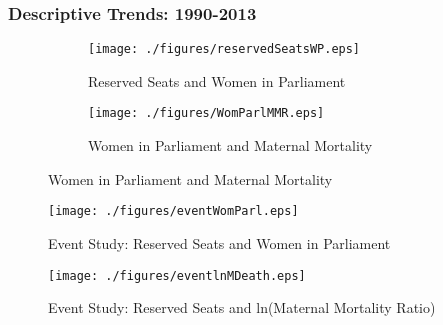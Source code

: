 \documentclass[9pt,letterpaper,subeqn]{beamer}
\begin{document}


\begin{frame}
  \frametitle{Descriptive Trends: 1990-2013}
\begin{figure}[htpb!]
  \begin{center}
    \caption{Reserved Seats, Women in Parliament and Maternal Mortality over Time}
    \label{fig:time}
    \begin{subfigure}{.5\textwidth}
      \centering
      \texttt{[image: ./figures/reservedSeatsWP.eps]}
      \caption{Reserved Seats and Women in Parliament}
      \label{fig:seatsWP}
    \end{subfigure}%
    \begin{subfigure}{.5\textwidth}
      \centering
      \texttt{[image: ./figures/WomParlMMR.eps]}
      \caption{Women in Parliament and Maternal Mortality}
      \label{fig:WPMMR}
    \end{subfigure}
  \end{center}
\end{figure}
\end{frame}


\begin{frame}[label=quotaWP]
  \begin{figure}
    \caption{Event Study: Reserved Seats and Women in Parliament}
    \texttt{[image: ./figures/eventWomParl.eps]}
  \end{figure}
\end{frame}

\begin{frame}[label=quotaMMR]
  \begin{figure}
    \caption{Event Study: Reserved Seats and ln(Maternal Mortality Ratio)}
    \texttt{[image: ./figures/eventlnMDeath.eps]}
  \end{figure}
\end{frame}



\end{document}
